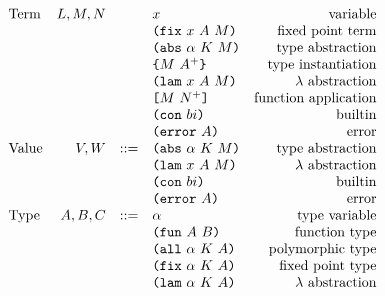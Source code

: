 \documentclass[../main.tex]{subfiles}
\begin{document}
\begin{figure*}[t]
    \centering
    \[\begin{array}{lrclr}
        \textrm{Term}             & L,M,N  &     & x                          & \textrm{variable}\\
                                  &        &     & \texttt{(} \texttt{fix} ~ x ~ A ~ M \texttt{)}              & \textrm{fixed point term}\\
                                  &        &     & \texttt{(} \texttt{abs} ~ \alpha ~ K ~ M \texttt{)}         & \textrm{type abstraction}\\
                                  &        &     & \texttt{\{}M ~ A^+\texttt{\}}              & \textrm{type instantiation}\\
                                  &        &     & \texttt{(} \texttt{lam} ~ x ~ A ~ M \texttt{)}              & \textrm{$\lambda$ abstraction}\\
                                  &        &     & \texttt{[} M ~ N^+ \texttt{]}               & \textrm{function application}\\
                                  &        &     & \texttt{(} \texttt{con} ~ bi \texttt{)}                   & \textrm{builtin}\\
                                  &        &     & \texttt{(} \texttt{error} ~ A \texttt{)}                  & \textrm{error}\\
        \textrm{Value}            & V,W    & ::= & \texttt{(} \texttt{abs} ~ \alpha ~ K ~ M \texttt{)}         & \textrm{type abstraction}\\
                                  &        &     & \texttt{(} \texttt{lam} ~ x ~ A ~ M \texttt{)}              & \textrm{$\lambda$ abstraction}\\
                                  &        &     & \texttt{(} \texttt{con} ~ bi \texttt{)}                   & \textrm{builtin}\\
                                  &        &     & \texttt{(} \texttt{error} ~ A \texttt{)}                  & \textrm{error}\\
        \textrm{Type}             & A,B,C  & ::= & \alpha                     & \textrm{type variable}\\
                                  &        &     & \texttt{(} \texttt{fun} ~ A ~ B \texttt{)}                & \textrm{function type}\\
                                  &        &     & \texttt{(} \texttt{all} ~ \alpha ~ K ~ A \texttt{)}        & \textrm{polymorphic type}\\
                                  &        &     & \texttt{(} \texttt{fix} ~ \alpha ~ K ~ A \texttt{)}        & \textrm{fixed point type}\\
                                  &        &     & \texttt{(} \texttt{lam} ~ \alpha ~ K ~ A \texttt{)}        & \textrm{$\lambda$ abstraction}\\

\end{array}\]
\end{figure*}
\end{document}
